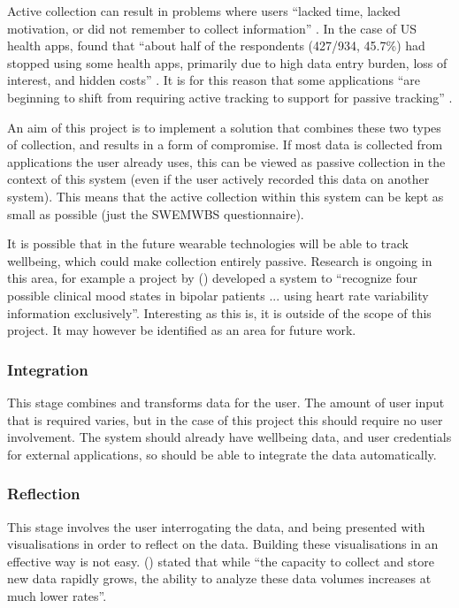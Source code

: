 \documentclass[11pt,openright,a4paper]{report}
\begin{document}
Active collection can result in problems where users \enquote{lacked time, lacked motivation, or did not remember to collect information} \parencite{li2010stage}. In the case of US health apps, \citeauthor{krebs2015health} found that \enquote{about half of the respondents (427/934, 45.7\%) had stopped using some health apps, primarily due to high data entry burden, loss of interest, and hidden costs} \parencite{krebs2015health}. It is for this reason that some applications \enquote{are beginning to shift from requiring active tracking to
support for passive tracking} \parencite{rooksby2014personal}.

An aim of this project is to implement a solution that combines these two types of collection, and results in a form of compromise. If most data is collected from applications the user already uses, this can be viewed as passive collection in the context of this system (even if the user actively recorded this data on another system). This means that the active collection within this system can be kept as small as possible (just the SWEMWBS questionnaire).

It is possible that in the future wearable technologies will be able to track wellbeing, which could make collection entirely passive. Research is ongoing in this area, for example a project by \citeauthor{valenza2014wearable} (\citeyear{valenza2014wearable}) developed a system to \enquote{recognize four possible clinical mood states in bipolar patients ... using heart rate variability information exclusively}. Interesting as this is, it is outside of the scope of this project. It may however be identified as an area for future work.

\subsubsection{Integration}
This stage combines and transforms data for the user. The amount of user input that is required varies, but in the case of this project this should require no user involvement. The system should already have wellbeing data, and user credentials for external applications, so should be able to integrate the data automatically.

\subsubsection{Reflection}
This stage involves the user interrogating the data, and being presented with visualisations in order to reflect on the data. Building these visualisations in an effective way is not easy. \citeauthor{keim2008visual} (\citeyear{keim2008visual}) stated that while \enquote{the capacity to collect and store new data rapidly grows, the ability to analyze these data volumes increases at much lower rates}.
\end{document}
